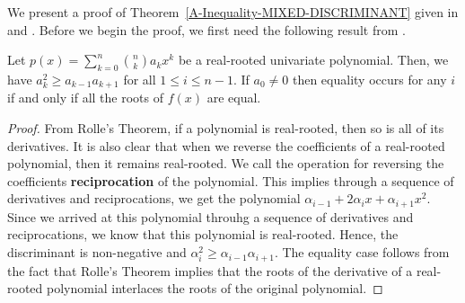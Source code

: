 \documentclass{puthesis-UG}
\begin{document}
We present a proof of Theorem~\ref{A-Inequality-MIXED-DISCRIMINANT} given in \cite{bapat_raghavan_1997} and \cite{schneider-mixed-discriminants}. Before we begin the proof, we first need the following result from \cite{hardy1952inequalities}. 

\begin{lem}  \label{newton}
	Let $p(x) = \sum_{k = 0}^n \binom{n}{k} a_k x^k$ be a real-rooted univariate polynomial. Then, we have $a_k^2 \geq a_{k-1}a_{k+1}$ for all $1 \leq i \leq n-1$. If $a_0 \neq 0$ then equality occurs for any $i$ if and only if all the roots of $f(x)$ are equal. 
\end{lem}

\begin{proof}
	From Rolle's Theorem, if a polynomial is real-rooted, then so is all of its derivatives. It is also clear that when we reverse the coefficients of a real-rooted polynomial, then it remains real-rooted. We call the operation for reversing the coefficients \textbf{reciprocation} of the polynomial. This implies through a sequence of derivatives and reciprocations, we get the polynomial $\alpha_{i-1} + 2\alpha_i x + \alpha_{i+1} x^2$. Since we arrived at this polynomial throuhg a sequence of derivatives and reciprocations, we know that this polynomial is real-rooted. Hence, the discriminant is non-negative and $\alpha_i^2 \geq \alpha_{i-1} \alpha_{i+1}$. The equality case follows from the fact that Rolle's Theorem implies that the roots of the derivative of a real-rooted polynomial interlaces the roots of the original polynomial. 
\end{proof}
\end{document}
